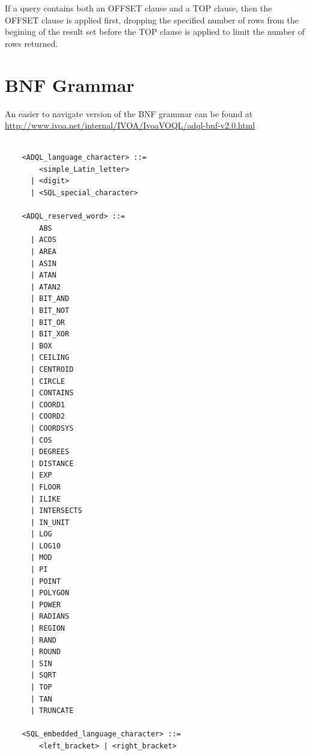 \documentclass[11pt,a4paper]{ivoa}
\begin{document}
If a query contains both an OFFSET clause and a TOP clause,
then the OFFSET clause is applied first, dropping the specified
number of rows from the begining of the result set before the
TOP clause is applied to limit the number of rows returned.

\appendix
\section{BNF Grammar}
\label{sec:grammar}

An easier to navigate version of the BNF grammar can be found at\\
\url{http://www.ivoa.net/internal/IVOA/IvoaVOQL/adql-bnf-v2.0.html}

\begin{verbatim}

    <ADQL_language_character> ::=
        <simple_Latin_letter>
      | <digit>
      | <SQL_special_character>

    <ADQL_reserved_word> ::=
        ABS
      | ACOS
      | AREA
      | ASIN
      | ATAN
      | ATAN2
      | BIT_AND
      | BIT_NOT
      | BIT_OR
      | BIT_XOR
      | BOX
      | CEILING
      | CENTROID
      | CIRCLE
      | CONTAINS
      | COORD1
      | COORD2
      | COORDSYS
      | COS
      | DEGREES
      | DISTANCE
      | EXP
      | FLOOR
      | ILIKE
      | INTERSECTS
      | IN_UNIT
      | LOG
      | LOG10
      | MOD
      | PI
      | POINT
      | POLYGON
      | POWER
      | RADIANS
      | REGION
      | RAND
      | ROUND
      | SIN
      | SQRT
      | TOP
      | TAN
      | TRUNCATE

    <SQL_embedded_language_character> ::=
        <left_bracket> | <right_bracket>


\end{verbatim}
\end{document}
